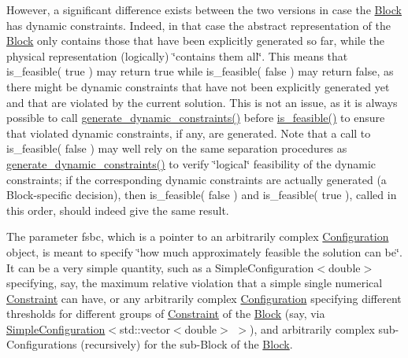 However, a significant difference exists between the two versions in case the \mbox{\hyperlink{class_s_m_spp__di__unipi__it_1_1_block}{Block}} has dynamic constraints. Indeed, in that case the abstract representation of the \mbox{\hyperlink{class_s_m_spp__di__unipi__it_1_1_block}{Block}} only contains those that have been explicitly generated so far, while the physical representation (logically) \char`\"{}contains
them all\char`\"{}. This means that is\+\_\+feasible( true ) may return true while is\+\_\+feasible( false ) may return false, as there might be dynamic constraints that have not been explicitly generated yet and that are violated by the current solution. This is not an issue, as it is always possible to call \mbox{\hyperlink{class_s_m_spp__di__unipi__it_1_1_block_a306892932ce912f30548f3f3e4072e9b}{generate\+\_\+dynamic\+\_\+constraints()}} before \mbox{\hyperlink{class_s_m_spp__di__unipi__it_1_1_block_a4204ffb542117f4ea97eeceeda4da079}{is\+\_\+feasible()}} to ensure that violated dynamic constraints, if any, are generated. Note that a call to is\+\_\+feasible( false ) may well rely on the same separation procedures as \mbox{\hyperlink{class_s_m_spp__di__unipi__it_1_1_block_a306892932ce912f30548f3f3e4072e9b}{generate\+\_\+dynamic\+\_\+constraints()}} to verify \char`\"{}logical\char`\"{} feasibility of the dynamic constraints; if the corresponding dynamic constraints are actually generated (a Block-\/specific decision), then is\+\_\+feasible( false ) and is\+\_\+feasible( true ), called in this order, should indeed give the same result.

The parameter fsbc, which is a pointer to an arbitrarily complex \mbox{\hyperlink{class_s_m_spp__di__unipi__it_1_1_configuration}{Configuration}} object, is meant to specify \char`\"{}how much approximately feasible
the solution can be\char`\"{}. It can be a very simple quantity, such as a Simple\+Configuration$<$double$>$ specifying, say, the maximum relative violation that a simple single numerical \mbox{\hyperlink{class_s_m_spp__di__unipi__it_1_1_constraint}{Constraint}} can have, or any arbitrarily complex \mbox{\hyperlink{class_s_m_spp__di__unipi__it_1_1_configuration}{Configuration}} specifying different thresholds for different groups of \mbox{\hyperlink{class_s_m_spp__di__unipi__it_1_1_constraint}{Constraint}} of the \mbox{\hyperlink{class_s_m_spp__di__unipi__it_1_1_block}{Block}} (say, via \mbox{\hyperlink{class_s_m_spp__di__unipi__it_1_1_simple_configuration}{Simple\+Configuration}}$<$std\+::vector$<$double$>$ $>$), and arbitrarily complex sub-\/\+Configurations (recursively) for the sub-\/\+Block of the \mbox{\hyperlink{class_s_m_spp__di__unipi__it_1_1_block}{Block}}.

